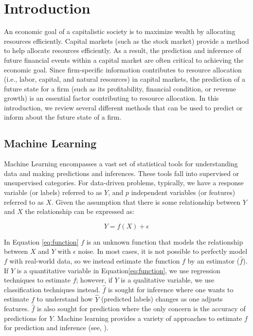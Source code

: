 \chapter{Introduction}


An economic goal of a capitalistic society is to maximize wealth by allocating resources efficiently.  Capital markets (such as the stock market) provide a method to help allocate resources efficiently. As a result, the prediction and inference of future financial events within a capital market are often critical to achieving the economic goal. Since firm-specific information contributes to resource allocation (i.e., labor, capital, and natural resources) in capital markets, the prediction of a future state for a firm (such as its profitability, financial condition, or revenue growth) is an essential factor contributing to resource allocation.  In this introduction, we review several different methods that can be used to predict or inform about the future state of a firm.  


\section{Machine Learning}

Machine Learning encompasses a vast set of statistical tools for understanding data and making predictions and inferences. These tools fall into supervised or unsupervised categories. For data-driven problems, typically, we have a response variable (or labels)  referred to as \(Y\), and \(p\) independent variables (or features) referred to as \(X\). Given the assumption that there is some relationship between \(Y\) and \(X\) the relationship can be expressed as:

\begin{equation}
\label{eq:function}
Y = f(X) + \epsilon
\end{equation}

\noindent In Equation \ref{eq:function} \(f\) is an unknown function that models the relationship between \(X\) and \(Y\) with  \( \epsilon \) noise.  In most cases, it is not possible to perfectly model \(f\) with real-world data, so we instead estimate the function \(f\) by an estimator (\(\hat{f}\)). If \(Y\) is a quantitative variable in Equation\ref{eq:function}, we use regression techniques to estimate \(f\); however, if \(Y\) is a qualitative variable, we use classification techniques instead.   \(\hat{f}\) is sought for inference where one wants to estimate \(f\) to understand how \(\hat{Y}\) (predicted labels) changes as one adjusts features. \(\hat{f}\) is also sought for prediction where the only concern is the accuracy of predictions for \(Y\). Machine learning provides a variety of approaches to estimate \(f\) for prediction and inference (see, \eg \cite{ISL}).

